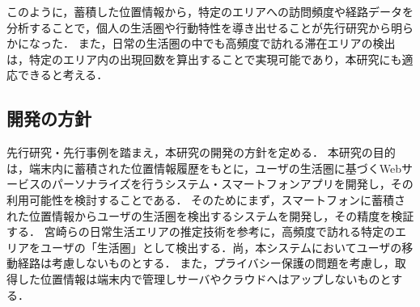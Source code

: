 \documentclass[a4paper]{jsarticle}
\begin{document}
このように，蓄積した位置情報から，特定のエリアへの訪問頻度や経路データを分析することで，個人の生活圏や行動特性を導き出せることが先行研究から明らかになった．
また，日常の生活圏の中でも高頻度で訪れる滞在エリアの検出は，特定のエリア内の出現回数を算出することで実現可能であり，本研究にも適応できると考える．




%
%
%
%
%
%

\subsection{開発の方針}
先行研究・先行事例を踏まえ，本研究の開発の方針を定める．
本研究の目的は，端末内に蓄積された位置情報履歴をもとに，ユーザの生活圏に基づくWebサービスのパーソナライズを行うシステム・スマートフォンアプリを開発し，その利用可能性を検討することである．
そのためにまず，スマートフォンに蓄積された位置情報からユーザの生活圏を検出するシステムを開発し，その精度を検証する．
宮崎らの日常生活エリアの推定技術\cite{docomo}を参考に，高頻度で訪れる特定のエリアをユーザの「生活圏」として検出する．尚，本システムにおいてユーザの移動経路は考慮しないものとする．
また，プライバシー保護の問題を考慮し，取得した位置情報は端末内で管理しサーバやクラウドへはアップしないものとする．
\end{document}
